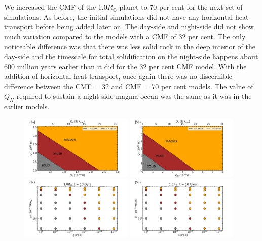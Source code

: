\documentclass[fleqn,usenatbib]{mnras}
\begin{document}
We increased the CMF of the 1.0$R_{\oplus}$ planet to 70 per cent for the next set of simulations. As before, the initial simulations did not have any horizontal heat transport before being added later on. The day-side and night-side did not show much variation compared to the models with a CMF of 32 per cent. The only noticeable difference was that there was less solid rock in the deep interior of the day-side and the timescale for total solidification on the night-side happens about 600 million years earlier than it did for the 32 per cent CMF model. With the addition of horizontal heat transport, once again there was no discernible difference between the CMF = 32 and CMF = 70 per cent models. The value of $Q_{H}$ required to sustain a night-side magma ocean was the same as it was in the earlier models. 


\begin{figure}\centering
\includegraphics[width=0.48\textwidth]{5a.jpg}
\includegraphics[width=0.48\textwidth]{5b.jpg}
\includegraphics[width=0.48\textwidth]{5c.jpg}
\includegraphics[width=0.48\textwidth]{5d.jpg}


\end{figure}
\end{document}
